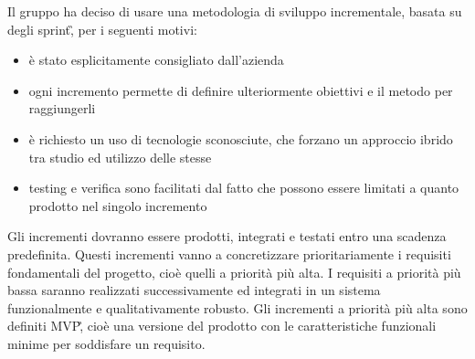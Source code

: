 Il gruppo ha deciso di usare una metodologia di sviluppo incrementale, basata su degli sprint\G, per i seguenti motivi:
\begin{itemize}
    \item 
        è stato esplicitamente consigliato dall'azienda
    \item 
        ogni incremento permette di definire ulteriormente 
        obiettivi e il metodo per raggiungerli
    \item 
        è richiesto un uso di tecnologie sconosciute, che forzano un 
        approccio ibrido tra studio ed utilizzo delle stesse
    \item
        testing e verifica sono facilitati dal fatto che possono essere 
        limitati a quanto prodotto nel singolo incremento
\end{itemize}
Gli incrementi dovranno essere prodotti, integrati e testati entro una scadenza predefinita. Questi incrementi vanno a concretizzare prioritariamente i requisiti fondamentali del progetto, cioè quelli a priorità più alta. I requisiti a priorità più bassa saranno realizzati successivamente ed integrati in un sistema funzionalmente e qualitativamente robusto.
Gli incrementi a priorità più alta sono definiti MVP\G, cioè una versione del prodotto con le caratteristiche funzionali minime per soddisfare un requisito.




